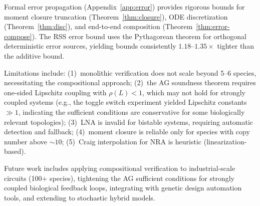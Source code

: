 \documentclass[11pt]{article}
\begin{document}
Formal error propagation (Appendix~\ref{app:error}) provides
rigorous bounds for moment closure truncation
(Theorem~\ref{thm:closure}), ODE discretization
(Theorem~\ref{thm:disc}), and end-to-end composition
(Theorem~\ref{thm:error-compose}). The RSS error bound
uses the Pythagorean theorem for orthogonal deterministic error
sources, yielding bounds consistently $1.18$--$1.35\times$ tighter
than the additive bound.

Limitations include: (1)~monolithic verification does not scale
beyond 5--6 species, necessitating the compositional approach;
(2)~the AG soundness theorem requires one-sided Lipschitz coupling
with $\rho(L) < 1$, which may not hold for strongly coupled systems
(e.g., the toggle switch experiment yielded Lipschitz constants
$\gg 1$, indicating the sufficient conditions are conservative for
some biologically relevant topologies);
(3)~LNA is invalid for bistable systems, requiring automatic
detection and fallback;
(4)~moment closure is reliable only for species with copy number
above ${\sim}10$;
(5)~Craig interpolation for NRA is heuristic (linearization-based).

Future work includes applying compositional verification to
industrial-scale circuits (100+ species), tightening the AG
sufficient conditions for strongly coupled biological feedback
loops, integrating with genetic design automation tools, and
extending to stochastic hybrid models.

\end{document}

